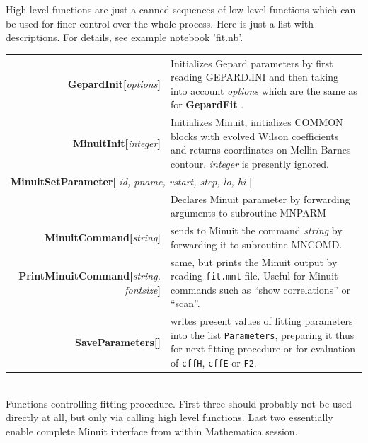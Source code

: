 \documentclass[12pt]{article}
\newcommand{\defboxitem}[3]{ {\ttfamily \bfseries #1[}\emph{#2}{\ttfamily \bfseries ]} & #3 }
\newcommand{\mmacomm}[1]{ {\ttfamily \bfseries #1} }
\begin{document}
High level functions are just a canned sequences of low level functions which can
be used for finer control over the whole process. Here is just a list with
descriptions. For details, see example notebook 'fit.nb'.


\begin{flushleft}
\colorbox{defbox}{%
\begin{minipage}{\textwidth}%
\begin{tabular}{rp{8cm}}%
\defboxitem{GepardInit}{options}{Initializes Gepard parameters by first reading GEPARD.INI
and then taking into account \emph{options} which are the same as for 
\mmacomm{GepardFit}. } \\[0.8ex]
\defboxitem{MinuitInit}{integer}{Initializes Minuit, initializes COMMON blocks with evolved
Wilson coefficients and returns coordinates on Mellin-Barnes contour. \emph{integer} is
presently ignored.} \\[0.8ex]
\multicolumn{2}{l}{\mmacomm{MinuitSetParameter[}\emph{id, pname, vstart, step, lo, hi}
\mmacomm{]} } \\
 & Declares Minuit parameter by forwarding arguments to subroutine MNPARM \\[0.8ex]
\defboxitem{MinuitCommand}{string}{sends to Minuit the command \emph{string} by
forwarding it to subroutine MNCOMD. } \\[0.8ex]
\defboxitem{PrintMinuitCommand}{string, fontsize}{same, but prints the Minuit output
by reading \texttt{fit.mnt} file. Useful for Minuit commands such as
``show correlations'' or ``scan''.} \\
\defboxitem{SaveParameters}{}{writes present values of fitting
parameters into the list \texttt{Parameters}, preparing it thus for next fitting procedure or
for evaluation of \texttt{cffH}, \texttt{cffE} or \texttt{F2}.}
\end{tabular}%
\end{minipage}}\\[0.5ex]
{\small Functions controlling fitting procedure. First three should probably not be
used directly at all, but only via calling high level functions. Last two essentially
enable complete Minuit interface from within Mathematica session.}
\end{flushleft}
\end{document}
